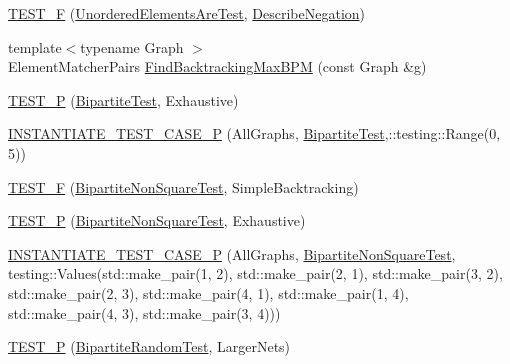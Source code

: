 \begin{DoxyCompactItemize}
\item 
\hyperlink{namespacetesting_1_1gmock__matchers__test_a3c4c92b68a08c5d541e46ed367e216ab}{T\+E\+S\+T\+\_\+F} (\hyperlink{classtesting_1_1gmock__matchers__test_1_1_unordered_elements_are_test}{Unordered\+Elements\+Are\+Test}, \hyperlink{namespacetesting_1_1gmock__matchers__test_afbc8022da5a58aa467ec414ab3e90908}{Describe\+Negation})
\item 
{\footnotesize template$<$typename Graph $>$ }\\Element\+Matcher\+Pairs \hyperlink{namespacetesting_1_1gmock__matchers__test_a09321a8d4a4c40ab1e369fbdf92b0414}{Find\+Backtracking\+Max\+B\+PM} (const Graph \&g)
\item 
\hyperlink{namespacetesting_1_1gmock__matchers__test_a20589d957fcfe5399e249084dbc23e82}{T\+E\+S\+T\+\_\+P} (\hyperlink{classtesting_1_1gmock__matchers__test_1_1_bipartite_test}{Bipartite\+Test}, Exhaustive)
\item 
\hyperlink{namespacetesting_1_1gmock__matchers__test_a3ca71a91f2b60ab08922acb7da0f8df0}{I\+N\+S\+T\+A\+N\+T\+I\+A\+T\+E\+\_\+\+T\+E\+S\+T\+\_\+\+C\+A\+S\+E\+\_\+P} (All\+Graphs, \hyperlink{classtesting_1_1gmock__matchers__test_1_1_bipartite_test}{Bipartite\+Test},\+::testing\+::\+Range(0, 5))
\item 
\hyperlink{namespacetesting_1_1gmock__matchers__test_a7d2395b1cb6a90bdc8d46ae06f99f6c7}{T\+E\+S\+T\+\_\+F} (\hyperlink{classtesting_1_1gmock__matchers__test_1_1_bipartite_non_square_test}{Bipartite\+Non\+Square\+Test}, Simple\+Backtracking)
\item 
\hyperlink{namespacetesting_1_1gmock__matchers__test_a3ac913ed55a7ac2636ae7bfce04296e9}{T\+E\+S\+T\+\_\+P} (\hyperlink{classtesting_1_1gmock__matchers__test_1_1_bipartite_non_square_test}{Bipartite\+Non\+Square\+Test}, Exhaustive)
\item 
\hyperlink{namespacetesting_1_1gmock__matchers__test_a64ef722e930c3088ddea704ac20194b5}{I\+N\+S\+T\+A\+N\+T\+I\+A\+T\+E\+\_\+\+T\+E\+S\+T\+\_\+\+C\+A\+S\+E\+\_\+P} (All\+Graphs, \hyperlink{classtesting_1_1gmock__matchers__test_1_1_bipartite_non_square_test}{Bipartite\+Non\+Square\+Test}, testing\+::\+Values(std\+::make\+\_\+pair(1, 2), std\+::make\+\_\+pair(2, 1), std\+::make\+\_\+pair(3, 2), std\+::make\+\_\+pair(2, 3), std\+::make\+\_\+pair(4, 1), std\+::make\+\_\+pair(1, 4), std\+::make\+\_\+pair(4, 3), std\+::make\+\_\+pair(3, 4)))
\item 
\hyperlink{namespacetesting_1_1gmock__matchers__test_ace6351a5a34b746491458140b06534ed}{T\+E\+S\+T\+\_\+P} (\hyperlink{classtesting_1_1gmock__matchers__test_1_1_bipartite_random_test}{Bipartite\+Random\+Test}, Larger\+Nets)

\end{DoxyCompactItemize}
